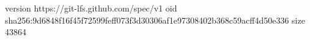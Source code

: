 version https://git-lfs.github.com/spec/v1
oid sha256:9d6848f16f45f72599feff073f3d30306af1e97308402b368c59acff4d50e336
size 43864

